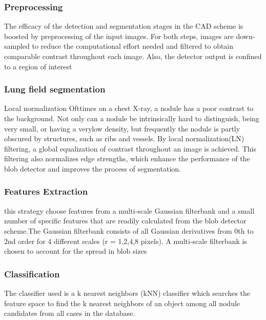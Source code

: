 \documentclass[hidelinks,12pt]{article}
\begin{document}
\subsubsection{Preprocessing}
The efficacy of the detection and segmentation stages in the CAD scheme is boosted by preprocessing of the input images.
For both steps, images are down-sampled to reduce the computational effort needed and filtered to obtain comparable contrast throughout each image. Also, the detector output is confined to a region of interest

\subsubsection{Lung field segmentation}
Local normalization
Ofttimes on a chest X-ray, a nodule has a poor contrast to the
background. 
Not only can a nodule be intrinsically hard to distinguish, 
being very small, or having a verylow density, but frequently the 
nodule is partly obscured  by structures, such as ribs and vessels.
 By local normalization(LN) filtering, a global equalization of contrast
throughout an image is achieved. This filtering also normalizes
edge strengths, which enhance the performance of the blob detector and improves the process of segmentation.

\subsubsection{Features Extraction}
this strategy choose features from a multi-scale Gaussian filterbank and a small number of specific features that are readily calculated from the blob detector scheme.The Gaussian filterbank consists of all Gaussian derivatives from 0th to 2nd order for 4 different scales (r = 1,2,4,8 pixels). A multi-scale filterbank is chosen to account for the spread in blob sizes


\subsubsection{Classification}
The classifier used is a k nearest neighbors (kNN) classifier
which searches the feature space to find the k nearest neighbors of an object among all nodule candidates
from all cases in the database.
\end{document}
